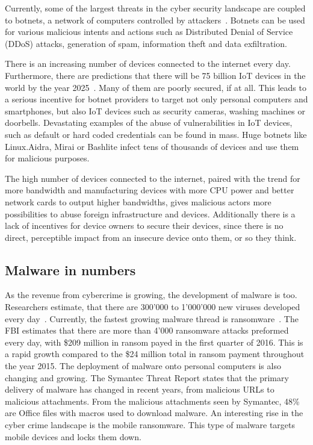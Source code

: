 Currently, some of the largest threats in the cyber security landscape are coupled to botnets, a network of computers controlled by attackers~\cite{Putman}.
Botnets can be used for various malicious intents and actions such as Distributed Denial of Service (DDoS) attacks, generation of spam, information theft and data exfiltration.

There is an increasing number of devices connected to the internet every day.
Furthermore, there are predictions that there will be 75 billion IoT devices in the world by the year 2025~\cite{Statista}.
Many of them are poorly secured, if at all.
This leads to a serious incentive for botnet providers to target not only personal computers and smartphones, but also IoT devices such as security cameras, washing machines or doorbells.
Devastating examples of the abuse of vulnerabilities in IoT devices, such as default or hard coded credentials can be found in mass.
Huge botnets like Linux.Aidra, Mirai or Bashlite infect tens of thousands of devices and use them for malicious purposes.

The high number of devices connected to the internet, paired with the trend for more bandwidth and manufacturing devices with more CPU power and better network cards to output higher bandwidths, gives malicious actors more possibilities to abuse foreign infrastructure and devices.
Additionally there is a lack of incentives for device owners to secure their devices, since there is no direct, perceptible impact from an insecure device onto them, or so they think.

\subsection{Malware in numbers}
As the revenue from cybercrime is growing, the development of malware is too.
Researchers estimate, that there are 300'000 to 1'000'000 new viruses developed every day~\cite{McAfee18}.
Currently, the fastest growing malware thread is ransomware~\cite{McAfee18}.
The FBI estimates that there are more than 4'000 ransomware attacks preformed every day, with \$209 million in ransom payed in the first quarter of 2016.
This is a rapid growth compared to the \$24 million total in ransom payment throughout the year 2015.
The deployment of malware onto personal computers is also changing and growing.
The Symantec Threat Report states that the primary delivery of malware has changed in recent years, from malicious URLs to malicious attachments.
From the malicious attachments seen by Symantec, 48\% are Office files with macros used to download malware.
An interesting rise in the cyber crime landscape is the mobile ransomware.
This type of malware targets mobile devices and locks them down.\cite{Symantec19}

